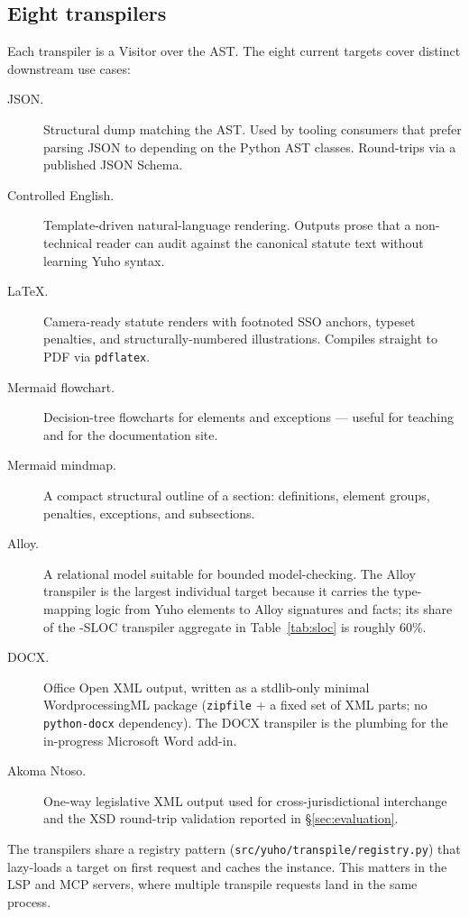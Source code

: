 \subsection{Eight transpilers}
\label{subsec:transpilers}
Each transpiler is a Visitor over the AST. The eight current targets cover
distinct downstream use cases:

\begin{description}
\item[JSON.] Structural dump matching the AST. Used by tooling consumers
that prefer parsing JSON to depending on the Python AST classes.
Round-trips via a published JSON Schema.
\item[Controlled English.] Template-driven natural-language rendering.
Outputs prose that a non-technical reader can audit against the canonical
statute text without learning Yuho syntax.
\item[\LaTeX{}.] Camera-ready statute renders with footnoted SSO anchors,
typeset penalties, and structurally-numbered illustrations. Compiles
straight to PDF via \texttt{pdflatex}.
\item[Mermaid flowchart.] Decision-tree flowcharts for elements and
exceptions --- useful for teaching and for the documentation site.
\item[Mermaid mindmap.] A compact structural outline of a section:
definitions, element groups, penalties, exceptions, and subsections.
\item[Alloy.] A relational model suitable for bounded model-checking.
The Alloy transpiler is the largest individual target because it carries the
type-mapping logic from Yuho elements to Alloy signatures and facts;
its share of the \statTRANSPILERS{}-SLOC transpiler aggregate in
Table~\ref{tab:sloc} is roughly 60\%.
\item[DOCX.] Office Open XML output, written as a stdlib-only minimal
WordprocessingML package (\texttt{zipfile} + a fixed set of XML parts;
no \texttt{python-docx} dependency). The DOCX transpiler is the
plumbing for the in-progress Microsoft Word add-in.
\item[Akoma Ntoso.] One-way legislative XML output used for
cross-jurisdictional interchange and the XSD round-trip validation
reported in \S\ref{sec:evaluation}.
\end{description}

The transpilers share a registry pattern (\texttt{src/yuho/transpile/registry.py})
that lazy-loads a target on first request and caches the instance. This
matters in the LSP and MCP servers, where multiple transpile requests
land in the same process.

